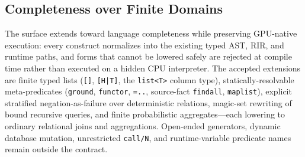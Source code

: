 \subsection{Completeness over Finite Domains}\label{sec:lang:completeness}

The surface extends toward language completeness while preserving GPU-native execution: every construct normalizes into the existing typed AST, RIR, and runtime paths, and forms that cannot be lowered safely are rejected at compile time rather than executed on a hidden CPU interpreter. The accepted extensions are finite typed lists (\texttt{[]}, \texttt{[H|T]}, the \texttt{list<T>} column type), statically-resolvable meta-predicates (\texttt{ground}, \texttt{functor}, \texttt{=..}, source-fact \texttt{findall}, \texttt{maplist}), explicit stratified negation-as-failure over deterministic relations, magic-set rewriting of bound recursive queries, and finite probabilistic aggregates---each lowering to ordinary relational joins and aggregations. Open-ended generators, dynamic database mutation, unrestricted \texttt{call/N}, and runtime-variable predicate names remain outside the contract.
